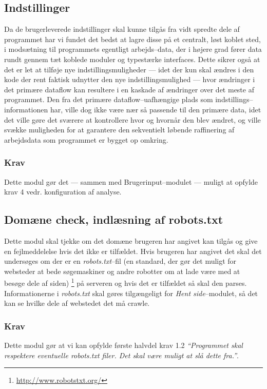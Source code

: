 \documentclass[a4paper,oneside]{memoir}
\begin{document}
\subsection{Indstillinger}
Da de brugerleverede indstillinger skal kunne tilgås fra vidt spredte
dele af programmet har vi fundet det bedst at lagre disse på et
centralt, løst koblet sted, i modsætning til programmets egentligt
arbejds--data, der i højere grad fører data rundt gennem tæt koblede
moduler og typestærke interfaces. Dette sikrer også at det er let at
tilføje nye indstillingsmuligheder --- idet der kun skal ændres i den
kode der rent faktisk udnytter den nye indstillingsmulighed --- hvor
ændringer i det primære dataflow kan resultere i en kaskade af
ændringer over det meste af programmet. Den fra det primære
dataflow--uafhængige plads som indstillings--informationen har, ville
dog ikke være nær så passende til den primære data, idet det ville
gøre det sværere at kontrollere hvor og hvornår den blev ændret, og
ville svække muligheden for at garantere den sekventielt løbende
raffinering af arbejdsdata som programmet er bygget op omkring.

\subsubsection{Krav}
Dette modul gør det --- sammen med Brugerinput--modulet --- muligt at
opfylde krav 4 vedr. konfiguration af analyse.

\subsection{Domæne check, indlæsning af robots.txt}
Dette modul skal tjekke om det domæne brugeren har angivet kan tilgås
og give en fejlmeddelelse hvis det ikke er tilfældet. Hvis brugeren
har angivet det skal det undersøges om der er en
\textit{robots.txt}--fil (en standard, der gør det muligt for websteder
at bede søgemaskiner og andre robotter om at lade være med at besøge
dele af siden) \footnote{\url{http://www.robotstxt.org/}} på serveren
og hvis det er tilfældet så skal den parses. Informationerne i
\textit{robots.txt} skal gøres tilgængeligt for \textit{Hent
  side}--modulet, så det kan se hvilke dele af webstedet det må crawle.

\subsubsection{Krav}
Dette modul gør at vi kan opfylde første halvdel krav 1.2
\textit{``Programmet skal respektere eventuelle robots.txt filer. Det
  skal være muligt at slå dette fra.''}.
\end{document}
